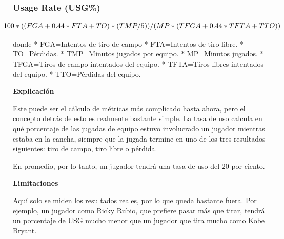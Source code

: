 \documentclass[
]{article}
\newenvironment{Shaded}{\begin{snugshade}}{\end{snugshade}}
\newcommand{\DecValTok}[1]{\textcolor[rgb]{0.00,0.00,0.81}{#1}}
\newcommand{\FloatTok}[1]{\textcolor[rgb]{0.00,0.00,0.81}{#1}}
\newcommand{\NormalTok}[1]{#1}
\newcommand{\OperatorTok}[1]{\textcolor[rgb]{0.81,0.36,0.00}{\textbf{#1}}}
\newcommand{\StringTok}[1]{\textcolor[rgb]{0.31,0.60,0.02}{#1}}
\begin{document}
\hypertarget{usage-rate-usg}{%
\subsubsection{Usage Rate (USG\%)}\label{usage-rate-usg}}

\[
  \makebox[\linewidth]{$100*((FGA+0.44*FTA+TO)*(TMP/5))/(MP*(TFGA+0.44*TFTA+TTO))$}
\]

donde * FGA=Intentos de tiro de campo * FTA=Intentos de tiro libre. *
TO=Pérdidas. * TMP=Minutos jugados por equipo. * MP=Minutos jugados. *
TFGA=Tiros de campo intentados del equipo. * TFTA=Tiros libres
intentados del equipo. * TTO=Pérdidas del equipo.

\textbf{Explicación}

Este puede ser el cálculo de métricas más complicado hasta ahora, pero
el concepto detrás de esto es realmente bastante simple. La tasa de uso
calcula en qué porcentaje de las jugadas de equipo estuvo involucrado un
jugador mientras estaba en la cancha, siempre que la jugada termine en
uno de los tres resultados siguientes: tiro de campo, tiro libre o
pérdida.

En promedio, por lo tanto, un jugador tendrá una tasa de uso del 20 por
ciento.

\textbf{Limitaciones}

Aquí solo se miden los resultados reales, por lo que queda bastante
fuera. Por ejemplo, un jugador como Ricky Rubio, que prefiere pasar más
que tirar, tendrá un porcentaje de USG mucho menor que un jugador que
tira mucho como Kobe Bryant.

\begin{Shaded}
\end{Shaded}
\end{document}
